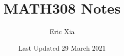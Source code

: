 \documentclass{article}
\title{MATH308 Notes}
\author{Eric Xia}
\date{Last Updated 29 March 2021}
\begin{document}
    \maketitle
    \tableofcontents
    \pagebreak



\end{document}
